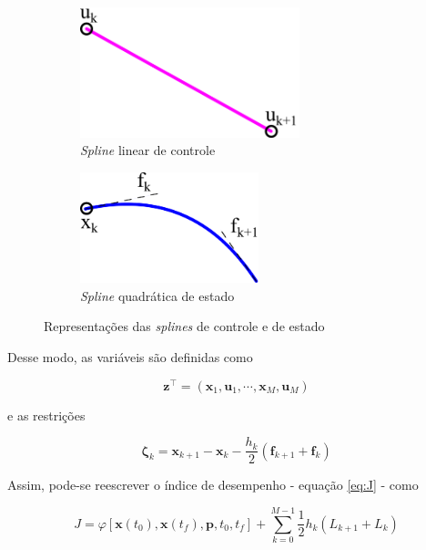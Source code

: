 \begin{figure}[H]
    \centering
    \begin{subfigure}{0.48\linewidth}
        \centering
        \includegraphics[width=0.7\textwidth]{Cap2/linear-spline.pdf}
        \caption{\textit{Spline} linear de controle}
    \end{subfigure}
    \hfill
    \begin{subfigure}{0.48\linewidth}
        \centering
        \includegraphics[width=0.57\textwidth]{Cap2/quadratic-spline.pdf}
        \caption{\textit{Spline} quadrática de estado}
    \end{subfigure}
    \caption{Representações das \textit{splines} de controle e de estado}
    \label{fig:splines}
\end{figure}

Desse modo, as variáveis são definidas como

\begin{equation}
    \mathbf{z}^\intercal = \left( \mathbf{x}_1, \mathbf{u}_1, \cdots, \mathbf{x}_M, \mathbf{u}_M \right)
\end{equation}

\noindent e as restrições

\begin{equation}
    \boldsymbol{\zeta}_k = \mathbf{x}_{k+1} - \mathbf{x}_k - \dfrac{h_k}{2} \left( \mathbf{f}_{k+1} + \mathbf{f}_k \right)
\end{equation}

Assim, pode-se reescrever o índice de desempenho - equação \ref{eq:J} - como

\begin{equation}
    J = \varphi \left[ \mathbf{x} \left( t_0 \right), \mathbf{x} \left( t_f \right), \mathbf{p}, t_0, t_f \right]
    + \sum_{k=0}^{M-1} \dfrac{1}{2} h_k \left( L_{k+1} + L_k \right)
\end{equation}


